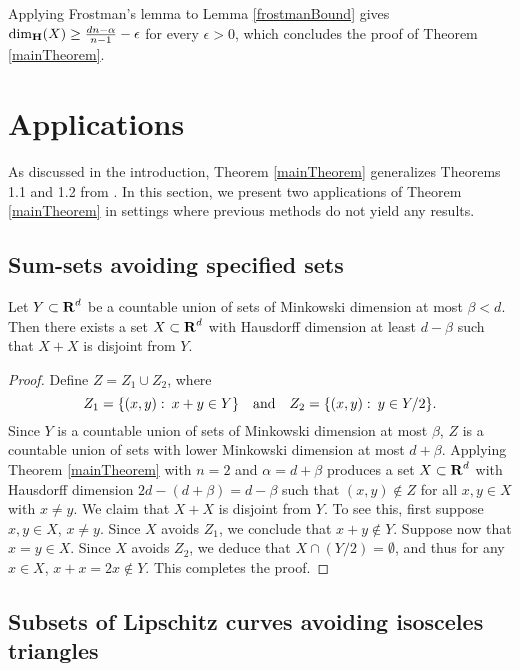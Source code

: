 Applying Frostman's lemma to Lemma \ref{frostmanBound} gives $\operatorname{\dim_{\mathbf{H}}}(X) \geq \frac{dn - \alpha}{n - 1} - \epsilon$ for every $\epsilon>0$, which concludes the proof of Theorem \ref{mainTheorem}.



\section{Applications}\label{applications}

As discussed in the introduction, Theorem \ref{mainTheorem} generalizes Theorems 1.1 and 1.2 from \cite{MalabikaRob}. In this section, we present two applications of Theorem \ref{mainTheorem} in settings where previous methods do not yield any results.

\subsection{Sum-sets avoiding specified sets}

\begin{theorem} \label{sumset-application} 
	Let $Y \subset \operatorname{\mathbf{R}}^d$ be a countable union of sets of Minkowski dimension at most $\beta < d$. Then there exists a set $X \subset \operatorname{\mathbf{R}}^d$ with Hausdorff dimension at least $d - \beta$ such that $X + X$ is disjoint from $Y$.
\end{theorem}
\begin{proof}
	Define $Z = Z_1 \cup Z_2$, where
	\[ Z_1 = \{ (x,y) \operatorname{\colon} x + y \in Y \} \quad \text{and} \quad Z_2 = \{ (x,y) \operatorname{\colon} y \in Y/2 \}. \]
	Since $Y$ is a countable union of sets of Minkowski dimension at most $\beta$, $Z$ is a countable union of sets with lower Minkowski dimension at most $d + \beta$. Applying Theorem \ref{mainTheorem} with $n = 2$ and $\alpha = d + \beta$ produces a set $X \subset \operatorname{\mathbf{R}}^d$ with Hausdorff dimension $2d  - (d + \beta) = d - \beta$ such that $(x,y) \not \in Z$ for all $x,y \in X$ with $x \neq y$. We claim that $X+ X$ is disjoint from $Y$. To see this, first suppose $x, y \in X$, $x \ne y$. Since $X$ avoids $Z_1$, we conclude that $x + y \not \in Y$. Suppose now that $x = y \in X$. Since $X$ avoids $Z_2$, we deduce that $X \cap (Y/2) = \emptyset$, and thus for any $x \in X$, $x + x = 2x \not \in Y$. This completes the proof.
\end{proof}


\subsection{Subsets of Lipschitz curves avoiding isosceles triangles}

